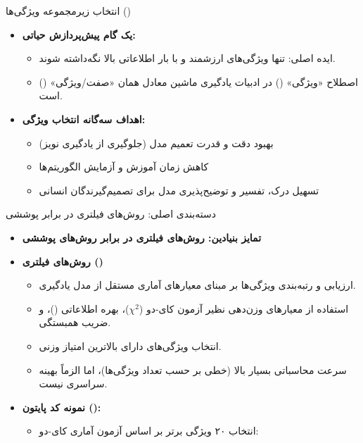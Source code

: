 \begin{frame}{انتخاب زیرمجموعه ویژگی‌ها ()}
\begin{itemize}
  \item \textbf{یک گام پیش‌پردازش حیاتی:}
  \begin{itemize}
    \item ایده اصلی: تنها ویژگی‌های ارزشمند و با بار اطلاعاتی بالا نگه‌داشته شوند.
    \item اصطلاح «ویژگی» () در ادبیات یادگیری ماشین معادل همان «صفت/ویژگی» () است.
  \end{itemize}
  \vspace{0.3cm}
  \item \textbf{اهداف سه‌گانه انتخاب ویژگی:}
  \begin{itemize}
    \item بهبود دقت و قدرت تعمیم مدل (جلوگیری از یادگیری نویز)
    \item کاهش زمان آموزش و آزمایش الگوریتم‌ها
    \item تسهیل درک، تفسیر و توضیح‌پذیری مدل برای تصمیم‌گیرندگان انسانی
  \end{itemize}
\end{itemize}
\end{frame}

\begin{frame}{دسته‌بندی اصلی: روش‌های فیلتری در برابر پوششی}
\begin{itemize}
  \item \textbf{تمایز بنیادین: روش‌های فیلتری در برابر روش‌های پوششی}
  \vspace{0.2cm}
  \item \textbf{روش‌های فیلتری ()}
  \begin{itemize}
    \item ارزیابی و رتبه‌بندی ویژگی‌ها بر مبنای معیارهای آماری مستقل از مدل یادگیری.
    \item استفاده از معیارهای وزن‌دهی نظیر آزمون کای-دو ($\chi^2$)، بهره اطلاعاتی ()، و ضریب همبستگی.
    \item انتخاب ویژگی‌های دارای بالاترین امتیاز وزنی.
    \item سرعت محاسباتی بسیار بالا (خطی بر حسب تعداد ویژگی‌ها)، اما الزماً بهینه سراسری نیست.
  \end{itemize}
  \vspace{0.25cm}
  \item \textbf{نمونه کد پایتون ():}
  \begin{itemize}
    \item انتخاب ۲۰ ویژگی برتر بر اساس آزمون آماری کای-دو:\\
    \vspace{0.1cm}
  \end{itemize}
\end{itemize}
\end{frame}

